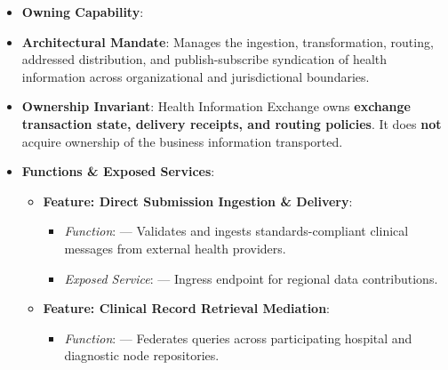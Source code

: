 \begin{itemize}

\item 
\textbf{Owning Capability}: \texttt{}



\item 
\textbf{Architectural Mandate}: Manages the ingestion, transformation, routing, addressed distribution, and publish-subscribe syndication of health information across organizational and jurisdictional boundaries.



\item 
\textbf{Ownership Invariant}: Health Information Exchange owns \textbf{exchange transaction state, delivery receipts, and routing policies}. It does \textbf{not} acquire ownership of the business information transported.



\item 
\textbf{Functions \& Exposed Services}:


\begin{itemize}

\item 
\textbf{Feature: Direct Submission Ingestion \& Delivery}:


\begin{itemize}

\item 
\emph{Function}: \texttt{} — Validates and ingests standards-compliant clinical messages from external health providers.



\item 
\emph{Exposed Service}: \texttt{} — Ingress endpoint for regional data contributions.



\end{itemize}


\item 
\textbf{Feature: Clinical Record Retrieval Mediation}:


\begin{itemize}

\item 
\emph{Function}: \texttt{} — Federates queries across participating hospital and diagnostic node repositories.




\end{itemize}
\end{itemize}
\end{itemize}
